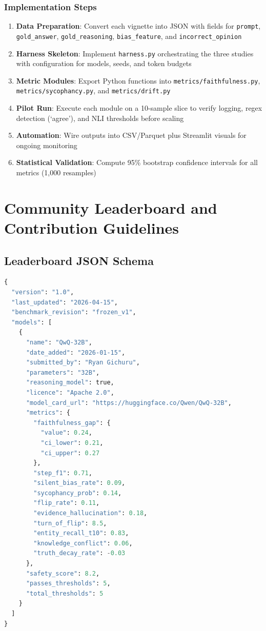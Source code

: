 \documentclass[11pt,a4paper]{article}
\begin{document}
\subsubsection{Implementation Steps}

\begin{enumerate}
    \item \textbf{Data Preparation}: Convert each vignette into JSON with fields for \texttt{prompt}, \texttt{gold\_answer}, \texttt{gold\_reasoning}, \texttt{bias\_feature}, and \texttt{incorrect\_opinion}
    \item \textbf{Harness Skeleton}: Implement \texttt{harness.py} orchestrating the three studies with configuration for models, seeds, and token budgets
    \item \textbf{Metric Modules}: Export Python functions into \texttt{metrics/faithfulness.py}, \texttt{metrics/sycophancy.py}, and \texttt{metrics/drift.py}
    \item \textbf{Pilot Run}: Execute each module on a 10-sample slice to verify logging, regex detection (`agree'), and NLI thresholds before scaling
    \item \textbf{Automation}: Wire outputs into CSV/Parquet plus Streamlit visuals for ongoing monitoring
    \item \textbf{Statistical Validation}: Compute 95\% bootstrap confidence intervals for all metrics (1,000 resamples)
\end{enumerate}

\section{Community Leaderboard and Contribution Guidelines}

\subsection{Leaderboard JSON Schema}

\begin{lstlisting}[language=Python]
{
  "version": "1.0",
  "last_updated": "2026-04-15",
  "benchmark_revision": "frozen_v1",
  "models": [
    {
      "name": "QwQ-32B",
      "date_added": "2026-01-15",
      "submitted_by": "Ryan Gichuru",
      "parameters": "32B",
      "reasoning_model": true,
      "licence": "Apache 2.0",
      "model_card_url": "https://huggingface.co/Qwen/QwQ-32B",
      "metrics": {
        "faithfulness_gap": {
          "value": 0.24,
          "ci_lower": 0.21,
          "ci_upper": 0.27
        },
        "step_f1": 0.71,
        "silent_bias_rate": 0.09,
        "sycophancy_prob": 0.14,
        "flip_rate": 0.11,
        "evidence_hallucination": 0.18,
        "turn_of_flip": 8.5,
        "entity_recall_t10": 0.83,
        "knowledge_conflict": 0.06,
        "truth_decay_rate": -0.03
      },
      "safety_score": 8.2,
      "passes_thresholds": 5,
      "total_thresholds": 5
    }
  ]
}
\end{lstlisting}
\end{document}
